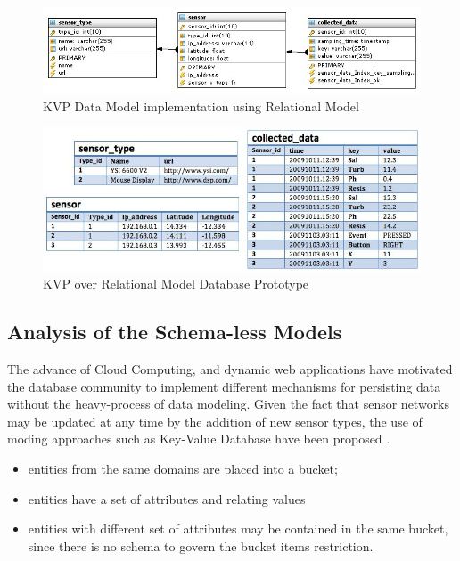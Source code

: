 \begin{figure}[!h]
  \centering
  \includegraphics[scale=0.5]{../diagrams/KVP-on-Relational-Model}
  \caption{KVP Data Model implementation using Relational Model}
  \label{fig:KVP-on-Relational-Model}
\end{figure}

\begin{figure}[!h]
  \centering
  \includegraphics[scale=0.5]{../diagrams/persistence-example-relational-kvp}
  \caption{KVP over Relational Model Database Prototype}
  \label{fig:persistence-example-relational-kvp}
\end{figure}

\subsection{Analysis of the Schema-less Models}

The advance of Cloud Computing, and dynamic web applications have motivated the
database community to implement different mechanisms for persisting data
without the heavy-process of data modeling. Given the fact that sensor networks
may be updated at any time by the addition of new sensor types, the use of
moding approaches such as Key-Value Database have been proposed \cite{db-kvp}.

\begin{itemize}
  \item entities from the same domains are placed into a bucket;
  \item entities have a set of attributes and relating values
  \item entities with different set of attributes may be contained in the same
  bucket, since there is no schema to govern the bucket items restriction.
\end{itemize}

